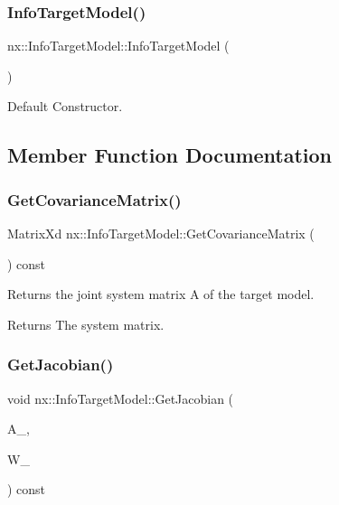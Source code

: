 \subsubsection{\texorpdfstring{Info\+Target\+Model()}{InfoTargetModel()}}
{\footnotesize\ttfamily nx\+::\+Info\+Target\+Model\+::\+Info\+Target\+Model (\begin{DoxyParamCaption}{ }\end{DoxyParamCaption})\hspace{0.3cm}{\ttfamily [inline]}}

Default Constructor. 

\subsection{Member Function Documentation}
\mbox{\label{classnx_1_1InfoTargetModel_a9387b0bd4e3e6d59570be7e7b369f792}} 
\subsubsection{\texorpdfstring{Get\+Covariance\+Matrix()}{GetCovarianceMatrix()}}
{\footnotesize\ttfamily Matrix\+Xd nx\+::\+Info\+Target\+Model\+::\+Get\+Covariance\+Matrix (\begin{DoxyParamCaption}{ }\end{DoxyParamCaption}) const\hspace{0.3cm}{\ttfamily [inline]}}

Returns the joint system matrix A of the target model. \begin{DoxyReturn}{Returns}
The system matrix. 
\end{DoxyReturn}
\mbox{\label{classnx_1_1InfoTargetModel_a371e2e95065f12fb672063eef87fa8c7}} 
\subsubsection{\texorpdfstring{Get\+Jacobian()}{GetJacobian()}}
{\footnotesize\ttfamily void nx\+::\+Info\+Target\+Model\+::\+Get\+Jacobian (\begin{DoxyParamCaption}\item[{Matrix\+Xd \&}]{A\+\_\+,  }\item[{Matrix\+Xd \&}]{W\+\_\+ }\end{DoxyParamCaption}) const\hspace{0.3cm}{\ttfamily [inline]}}

